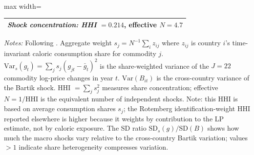 \begin{table}[htbp]
\begin{adjustbox}{max width=\textwidth}
\begin{threeparttable}
\begin{tabular}{l rrrrr}
\midrule
\multicolumn{6}{l}{\textit{Shock concentration: HHI} $= 0.214$, effective $N = 4.7$} \\
\bottomrule
\end{tabular}
\begin{tablenotes}\small
\item \textit{Notes:} Following \citet{borusyak2022quasi}. Aggregate weight $s_j = N^{-1}\sum_i z_{ij}$ where $z_{ij}$ is country $i$'s time-invariant caloric consumption share for commodity $j$. $\text{Var}_s(g_t) = \sum_j s_j(g_{jt} - \bar{g}_t)^2$ is the share-weighted variance of the $J=22$ commodity log-price changes in year $t$. $\text{Var}(B_{it})$ is the cross-country variance of the Bartik shock. HHI $= \sum_j s_j^2$ measures share concentration; effective $N = 1/\text{HHI}$ is the equivalent number of independent shocks. Note: this HHI is based on average consumption shares $s_j$; the Rotemberg identification-weight HHI reported elsewhere is higher because it weights by contribution to the LP estimate, not by caloric exposure. The SD ratio $\text{SD}_s(g)/\text{SD}(B)$ shows how much the macro shocks vary relative to the cross-country Bartik variation; values $>1$ indicate share heterogeneity compresses variation.
\end{tablenotes}
\end{threeparttable}
\end{adjustbox}
\end{table}
